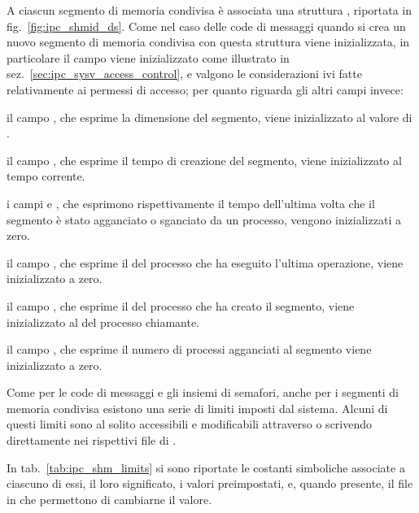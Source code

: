 A ciascun segmento di memoria condivisa è associata una struttura
, riportata in fig.~\ref{fig:ipc_shmid_ds}.  Come nel caso
delle code di messaggi quando si crea un nuovo segmento di memoria condivisa
con  questa struttura viene inizializzata, in particolare il
campo  viene inizializzato come illustrato in
sez.~\ref{sec:ipc_sysv_access_control}, e valgono le considerazioni ivi fatte
relativamente ai permessi di accesso; per quanto riguarda gli altri campi
invece:
\begin{itemize*}
\item il campo , che esprime la dimensione del segmento, viene
  inizializzato al valore di .
\item il campo , che esprime il tempo di creazione del
  segmento, viene inizializzato al tempo corrente.
\item i campi  e , che esprimono
  rispettivamente il tempo dell'ultima volta che il segmento è stato
  agganciato o sganciato da un processo, vengono inizializzati a zero.
\item il campo , che esprime il  del processo che ha
  eseguito l'ultima operazione, viene inizializzato a zero.
\item il campo , che esprime il  del processo che ha
  creato il segmento, viene inizializzato al  del processo chiamante.
\item il campo , che esprime il numero di processi agganciati
  al segmento viene inizializzato a zero.
\end{itemize*}

Come per le code di messaggi e gli insiemi di semafori, anche per i segmenti
di memoria condivisa esistono una serie di limiti imposti dal sistema.  Alcuni
di questi limiti sono al solito accessibili e modificabili attraverso
 o scrivendo direttamente nei rispettivi file di
. 

In tab.~\ref{tab:ipc_shm_limits} si sono riportate le
costanti simboliche associate a ciascuno di essi, il loro significato, i
valori preimpostati, e, quando presente, il file in 
che permettono di cambiarne il valore. 


